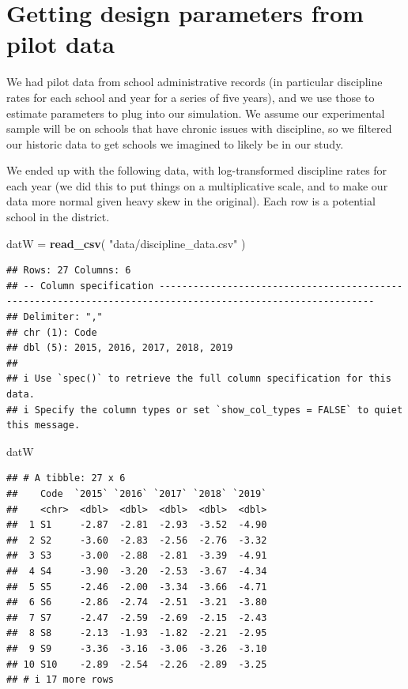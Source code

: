 \documentclass[
]{book}
\newenvironment{Shaded}{\begin{snugshade}}{\end{snugshade}}
\newcommand{\FunctionTok}[1]{\textcolor[rgb]{0.13,0.29,0.53}{\textbf{#1}}}
\newcommand{\NormalTok}[1]{#1}
\newcommand{\OtherTok}[1]{\textcolor[rgb]{0.56,0.35,0.01}{#1}}
\newcommand{\StringTok}[1]{\textcolor[rgb]{0.31,0.60,0.02}{#1}}
\begin{document}
\section{Getting design parameters from pilot data}\label{getting-design-parameters-from-pilot-data}

We had pilot data from school administrative records (in particular discipline rates for each school and year for a series of five years), and we use those to estimate parameters to plug into our simulation.
We assume our experimental sample will be on schools that have chronic issues
with discipline, so we filtered our historic data to get schools we imagined to likely be in our study.

We ended up with the following data, with log-transformed discipline rates for each year (we did this to put things on a multiplicative scale, and to make our data more normal given heavy skew in the original). Each row is a potential school in the district.

\begin{Shaded}
\begin{Highlighting}[]
\NormalTok{datW }\OtherTok{=} \FunctionTok{read\_csv}\NormalTok{( }\StringTok{"data/discipline\_data.csv"}\NormalTok{ )}
\end{Highlighting}
\end{Shaded}

\begin{verbatim}
## Rows: 27 Columns: 6
## -- Column specification ------------------------------------------------------------------------------------------------------------
## Delimiter: ","
## chr (1): Code
## dbl (5): 2015, 2016, 2017, 2018, 2019
## 
## i Use `spec()` to retrieve the full column specification for this data.
## i Specify the column types or set `show_col_types = FALSE` to quiet this message.
\end{verbatim}

\begin{Shaded}
\begin{Highlighting}[]
\NormalTok{datW}
\end{Highlighting}
\end{Shaded}

\begin{verbatim}
## # A tibble: 27 x 6
##    Code  `2015` `2016` `2017` `2018` `2019`
##    <chr>  <dbl>  <dbl>  <dbl>  <dbl>  <dbl>
##  1 S1     -2.87  -2.81  -2.93  -3.52  -4.90
##  2 S2     -3.60  -2.83  -2.56  -2.76  -3.32
##  3 S3     -3.00  -2.88  -2.81  -3.39  -4.91
##  4 S4     -3.90  -3.20  -2.53  -3.67  -4.34
##  5 S5     -2.46  -2.00  -3.34  -3.66  -4.71
##  6 S6     -2.86  -2.74  -2.51  -3.21  -3.80
##  7 S7     -2.47  -2.59  -2.69  -2.15  -2.43
##  8 S8     -2.13  -1.93  -1.82  -2.21  -2.95
##  9 S9     -3.36  -3.16  -3.06  -3.26  -3.10
## 10 S10    -2.89  -2.54  -2.26  -2.89  -3.25
## # i 17 more rows
\end{verbatim}
\end{document}

